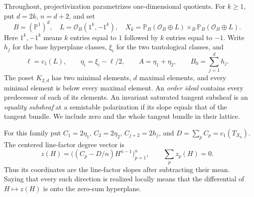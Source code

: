\documentclass[11pt]{amsart}
\theoremstyle{definition}
\theoremstyle{remark}
\newcommand{\PP}{\mathbb P}
\newcommand{\cO}{\mathcal O}
\begin{document}
Throughout, projectivization parametrizes one-dimensional quotients.
For \(k\ge1\), put \(d=2k\), \(n=d+2\), and set
\begin{equation}\label{eq01:family}
 B=(\PP^1)^d,\quad L=\cO_B(1^k,-1^k),\quad
 X_k=\PP_B(\cO_B\oplus L)\times_B\PP_B(\cO_B\oplus L).
\end{equation}
Here \(1^k,-1^k\) means \(k\) entries equal to \(1\) followed by
\(k\) entries equal to \(-1\). Write \(h_j\) for the base hyperplane
classes, \(\xi_i\) for the two tautological classes, and
\[
 \ell=c_1(L),\qquad \eta_i=\xi_i-\ell/2,
 \qquad A=\eta_1+\eta_2,\qquad B_0=\sum_{j=1}^d h_j.
\]
The poset \(K_{2,d}\) has two minimal elements, \(d\) maximal elements,
and every minimal element is below every maximal element. An
\emph{order ideal} contains every predecessor of each of its elements.
An invariant saturated tangent subsheaf is an \emph{equality subsheaf}
at a semistable polarization if its slope equals that of the tangent
bundle. We include zero and the whole tangent bundle in their lattice.

For this family put \(C_1=2\eta_1\), \(C_2=2\eta_2\),
\(C_{j+2}=2h_j\), and \(D=\sum_pC_p=c_1(T_{X_k})\).
The centered line-factor degree vector is
\[
 z(H)=\bigl((C_p-D/n)H^{n-1}\bigr)_{p=1}^n,
 \qquad \sum_p z_p(H)=0.
\]
Thus its coordinates are the line-factor slopes after subtracting
their mean. Saying that every such direction is realized locally
means that the differential of \(H\mapsto z(H)\) is onto the
zero-sum hyperplane.
\end{document}
